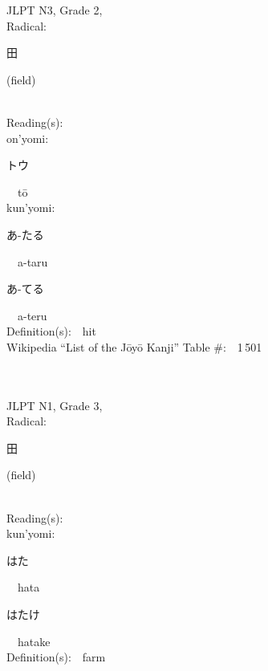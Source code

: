 \begin{multicols}{2}
{JLPT N3, Grade 2, \\Radical:\ \ {\begin{CJK}{UTF8}{min} 田 \end{CJK}} (field) } \\
Reading(s):\ \ \\
{\hspace*{1em}}on'yomi:\ \ \\
{\hspace*{2em}}{\begin{CJK}{UTF8}{min} トウ \end{CJK}}\ \ t\=o\ \ \\
{\hspace*{1em}}kun'yomi:\ \ \\
{\hspace*{2em}}{\begin{CJK}{UTF8}{min} あ-たる \end{CJK}}\ \ a-taru\ \ \\
{\hspace*{2em}}{\begin{CJK}{UTF8}{min} あ-てる \end{CJK}}\ \ a-teru\ \ \\
Definition(s):\ \ hit \\
Wikipedia ``List of the J\=oy\=o Kanji'' Table \#:\ \ 1\,501 \\
\ \ \\
{\fontsize{34pt}{40pt}  }\ \ \\  %
{JLPT N1, Grade 3, \\Radical:\ \ {\begin{CJK}{UTF8}{min} 田 \end{CJK}} (field) } \\
Reading(s):\ \ \\
{\hspace*{1em}}kun'yomi:\ \ \\
{\hspace*{2em}}{\begin{CJK}{UTF8}{min} はた \end{CJK}}\ \ hata\ \ \\
{\hspace*{2em}}{\begin{CJK}{UTF8}{min} はたけ \end{CJK}}\ \ hatake\ \ \\
Definition(s):\ \ farm \\

\end{multicols}
